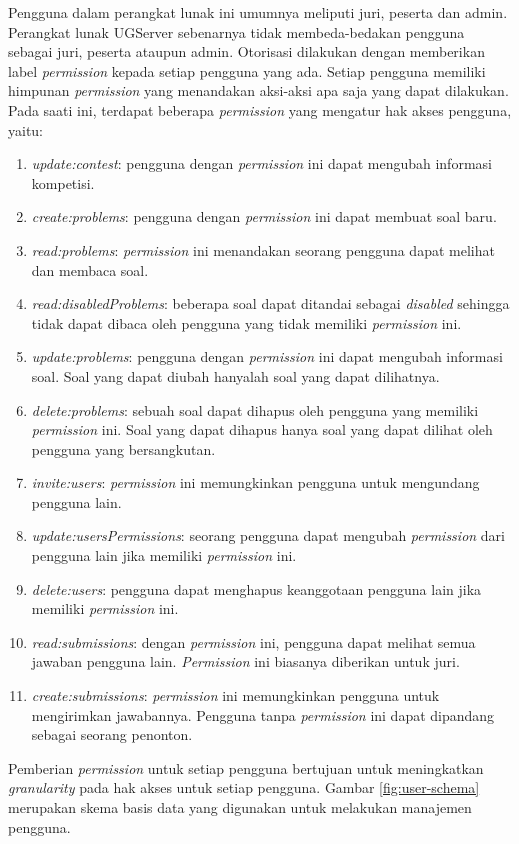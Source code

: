 Pengguna dalam perangkat lunak ini umumnya meliputi juri, peserta dan admin. Perangkat lunak UGServer sebenarnya tidak membeda-bedakan pengguna sebagai juri, peserta ataupun admin. Otorisasi dilakukan dengan memberikan label \textit{permission} kepada setiap pengguna yang ada. Setiap pengguna memiliki himpunan \textit{permission} yang menandakan aksi-aksi apa saja yang dapat dilakukan. Pada saati ini, terdapat beberapa \textit{permission} yang mengatur hak akses pengguna, yaitu:
\begin{enumerate}
    \item \textit{update:contest}: pengguna dengan \textit{permission} ini dapat mengubah informasi kompetisi.
    \item \textit{create:problems}: pengguna dengan \textit{permission} ini dapat membuat soal baru.
    \item \textit{read:problems}: \textit{permission} ini menandakan seorang pengguna dapat melihat dan membaca soal.
    \item \textit{read:disabledProblems}: beberapa soal dapat ditandai sebagai \textit{disabled} sehingga tidak dapat dibaca oleh pengguna yang tidak memiliki \textit{permission} ini.
    \item \textit{update:problems}: pengguna dengan \textit{permission} ini dapat mengubah informasi soal. Soal yang dapat diubah hanyalah soal yang dapat dilihatnya.
    \item \textit{delete:problems}: sebuah soal dapat dihapus oleh pengguna yang memiliki \textit{permission} ini. Soal yang dapat dihapus hanya soal yang dapat dilihat oleh pengguna yang bersangkutan.
    \item \textit{invite:users}: \textit{permission} ini memungkinkan pengguna untuk mengundang pengguna lain.
    \item \textit{update:usersPermissions}: seorang pengguna dapat mengubah \textit{permission} dari pengguna lain jika memiliki \textit{permission} ini.
    \item \textit{delete:users}: pengguna dapat menghapus keanggotaan pengguna lain jika memiliki \textit{permission} ini.
    \item \textit{read:submissions}: dengan \textit{permission} ini, pengguna dapat melihat semua jawaban pengguna lain. \textit{Permission} ini biasanya diberikan untuk juri.
    \item \textit{create:submissions}: \textit{permission} ini memungkinkan pengguna untuk mengirimkan jawabannya. Pengguna tanpa \textit{permission} ini dapat dipandang sebagai seorang penonton.
\end{enumerate}
Pemberian \textit{permission} untuk setiap pengguna bertujuan untuk meningkatkan \textit{granularity} pada hak akses untuk setiap pengguna. Gambar \ref{fig:user-schema} merupakan skema basis data yang digunakan untuk melakukan manajemen pengguna.

